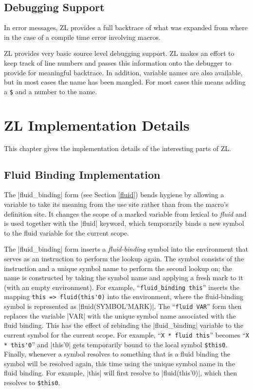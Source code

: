 \section{Debugging Support}
\label{debugging-support}

In error messages, ZL provides a full backtrace of what was expanded
from where in the case of a compile time error involving macros.

ZL provides very basic source level debugging support.  ZL makes an
effort to keep track of line numbers and passes this information onto
the debugger to provide for meaningful backtrace.  
In addition, variable names are also available, but in most cases the
name has been mangled.  For most cases this means 
adding a \verb/$/ and a number to the name.

\chapter{ZL Implementation Details}
\label{impl}

This chapter gives the implementation details of the interesting parts
of ZL.

\section{Fluid Binding Implementation}

The |fluid_binding| form (see Section \ref{fluid}) bends hygiene by
allowing a variable to take its meaning from the use site 
rather than from the macro's definition site.
It changes the scope of a marked variable from lexical to \textit{fluid}
and is used together with the |fluid| keyword, which temporarily binds a
new symbol to the fluid variable for the current scope.

The |fluid_binding| form inserts a \textit{fluid-binding}
symbol into the environment that serves as an instruction to perform
the lookup again.  The symbol consists of the instruction and a unique
symbol name to perform the second lookup on; the name is constructed
by taking the symbol name and applying a fresh mark to it (with an
empty environment).  For example, ``\verb|fluid_binding this|''
inserts the mapping \verb|this => fluid(this'0)| into the environment,
where the fluid-binding symbol is represented as
|fluid(SYMBOL'MARK)|.  The ``\verb|fluid VAR|'' form then replaces
the variable |VAR| with the unique symbol name associated with the
fluid binding.  This has the effect of rebinding the |fluid_binding|
variable to the current symbol for the current scope.  For example,
``\verb|X * fluid this|'' becomes ``\verb|X * this'0|'' and
|this'0| gets temporarily bound to the local symbol \verb|$this0|.
Finally, whenever a symbol resolves to something that is a fluid
binding the symbol will be resolved again, this time using the unique
symbol name in the fluid binding.  For example, |this| will first
resolve to |fluid(this'0)|, which then resolves to \verb|$this0|.

